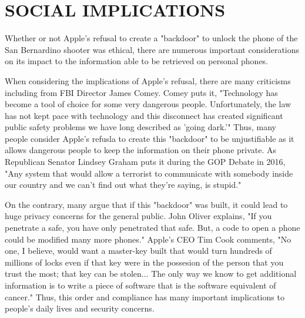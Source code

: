 \section{SOCIAL IMPLICATIONS}
Whether or not Apple's refusal to create a "backdoor" to unlock the phone of the San Bernardino shooter was ethical, there are numerous important considerations on its impact to the information able to be retrieved on personal phones.\par

When considering the implications of Apple's refusal, there are many criticisms including from FBI Director James Comey. Comey puts it, "Technology has become a tool of choice for some very dangerous people. Unfortunately, the law has not kept pace with technology and this disconnect has created significant public safety problems we have long described as 'going dark.'"\cite{brookings} Thus, many people consider Apple's refusla to create this "backdoor" to be unjustifiable as it allows dangerous people to keep the information on their phone private. As Republican Senator Lindsey Graham puts it during the GOP Debate in 2016, "Any system that would allow a terrorist to communicate with somebody inside our country and we can't find out what they're saying, is stupid."\cite{CNN-GOP-Debate}\par

On the contrary, many argue that if this "backdoor" was built, it could lead to huge privacy concerns for the general public. John Oliver explains, "If you penetrate a safe, you have only penetrated that safe. But, a code to open a phone could be modified many more phones."\cite{John-Oliver} Apple's CEO Tim Cook comments, "No one, I believe, would want a master-key built that would turn hundreds of millions of locks even if that key were in the possesion of the person that you trust the most; that key can be stolen... The only way we know to get additional information is to write a piece of software that is the software equivalent of cancer."\cite{ABC-TimCook} Thus, this order and compliance has many important implications to people's daily lives and security concerns. 






